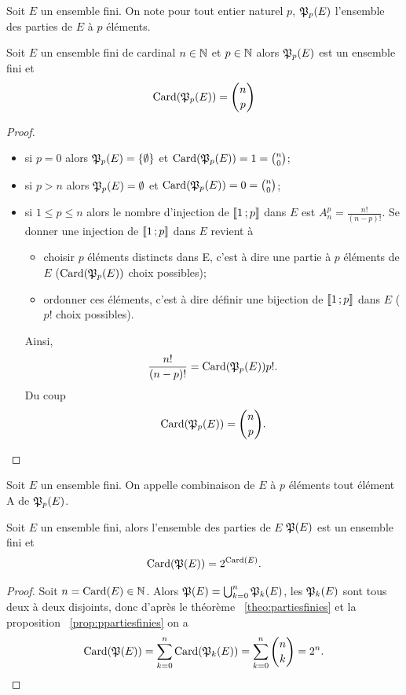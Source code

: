 Soit \(E\) un ensemble fini. On note pour tout entier naturel \(p\), \(\mathfrak{P}_p(E)\) l'ensemble des parties de \(E\) à \(p\) éléments.
\begin{prop}\label{prop:ppartiesfinies}
  Soit \(E\) un ensemble fini de cardinal \(n\in \mathbb{N}\) et \(p \in \mathbb{N}\) alors \(\mathfrak{P}_p(E)\) est un ensemble fini et
  \begin{equation}
    \operatorname{Card}(\mathfrak{P}_p(E))=\binom{n}{p}
  \end{equation}
\end{prop}
\begin{proof}
  \begin{itemize}
  \item si \(p=0\) alors \(\mathfrak{P}_p(E)=\{\emptyset\}\) et \(\operatorname{Card}(\mathfrak{P}_p(E))=1=\binom{n}{0}\);
  \item si \(p>n\) alors \(\mathfrak{P}_p(E)=\emptyset\) et \(\operatorname{Card}(\mathfrak{P}_p(E))=0=\binom{n}{0}\);
  \item si \(1\leqslant p \leqslant n\) alors le nombre d'injection de \(\mathopen{\llbracket}1\mathclose{}\mathpunct{};p\mathclose{\rrbracket}\) dans \(E\) est \(A_{n}^p=\frac{n!}{(n-p)!}\). Se donner une injection de  \(\mathopen{\llbracket}1\mathclose{}\mathpunct{};p\mathclose{\rrbracket}\) dans \(E\) revient à
    \begin{itemize}
    \item choisir \(p\) éléments distincts dans E, c'est à dire une partie à \(p\) éléments de \(E\) (\(\operatorname{Card}(\mathfrak{P}_p(E))\) choix possibles);
    \item ordonner ces éléments, c'est à dire définir une bijection de \(\mathopen{\llbracket}1\mathclose{}\mathpunct{};p\mathclose{\rrbracket}\) dans \(E\) (\(p!\) choix possibles).
    \end{itemize}
    Ainsi,
    \begin{equation}
      \frac{n!}{(n-p)!}=\operatorname{Card}(\mathfrak{P}_p(E)) p!.
    \end{equation}
    Du coup
    \begin{equation}
      \operatorname{Card}(\mathfrak{P}_p(E))=\binom{n}{p}.
    \end{equation}
  \end{itemize}
\end{proof}
\begin{defdef}
  Soit \(E\) un ensemble fini. On appelle combinaison de \(E\) à \(p\) éléments tout élément A de \(\mathfrak{P}_p(E)\).
\end{defdef}
\begin{prop}
  Soit \(E\) un ensemble fini, alors l'ensemble des parties de \(E\) \(\mathfrak{P}(E)\) est un ensemble fini et
  \begin{equation}
    \operatorname{Card}(\mathfrak{P}(E))=2^{\operatorname{Card}(E)}.
  \end{equation}
\end{prop}
\begin{proof}
  Soit \(n=\operatorname{Card}(E)\in \mathbb{N}\). Alors \(\mathfrak{P}(E)=\bigcup_{k=0}^{n}\mathfrak{P}_k(E)\), les \(\mathfrak{P}_k(E)\) sont tous deux à deux disjoints, donc d'après le théorème~
\ref{theo:partiesfinies} et la proposition~
\ref{prop:ppartiesfinies} on a
  \begin{equation}
    \operatorname{Card}(\mathfrak{P}(E))=\sum_{k=0}^n \operatorname{Card}(\mathfrak{P}_k(E))=\sum_{k=0}^n \binom{n}{k}=2^n.
  \end{equation}
\end{proof}
